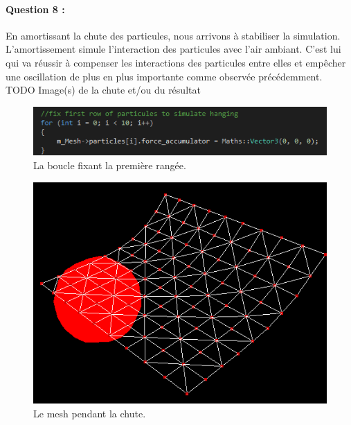 \documentclass[a4paper,12pt]{article}
\begin{document}
\paragraph{Question 8 :} En amortissant la chute des particules, nous arrivons à stabiliser la simulation. L'amortissement simule l'interaction des particules avec l'air ambiant. C'est lui qui va réussir à compenser les interactions des particules entre elles et empêcher une oscillation de plus en plus importante comme observée précédemment. 
TODO Image(s) de la chute et/ou du résultat
\begin{figure}
  \centering
  \includegraphics{images/rideau_code.png}
  \caption{La boucle fixant la première rangée.}
  \label{fig:rideauCode}
\end{figure}
\begin{figure}
  \centering
  \includegraphics{images/rideau_chute.png}
  \caption{Le mesh pendant la chute.}
  \label{fig:rideauCode}
\end{figure}
\end{document}
